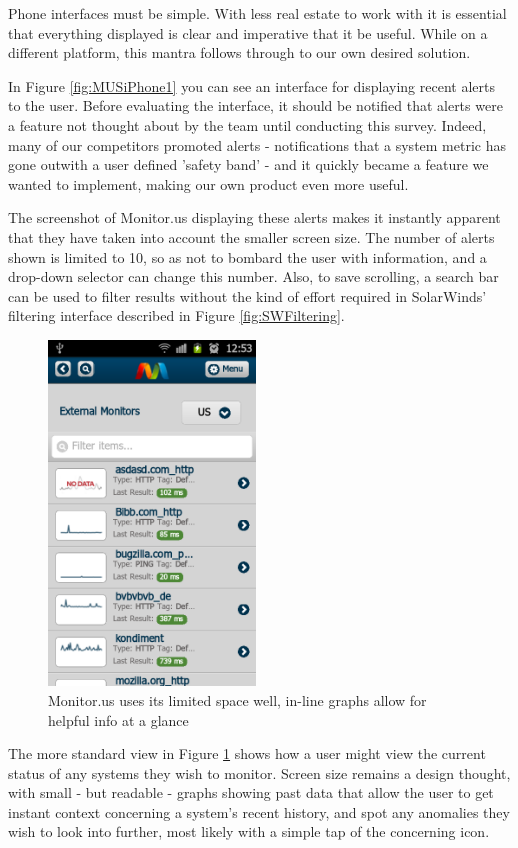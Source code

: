 \documentclass{l3proj}
\begin{document}
Phone interfaces must be simple. With less real estate to work with it is essential that everything displayed is clear and imperative that it be useful. While on a different platform, this mantra follows through to our own desired solution.

In Figure \ref{fig:MUSiPhone1} you can see an interface for displaying recent alerts to the user. Before evaluating the interface, it should be notified that alerts were a feature not thought about by the team until conducting this survey. Indeed, many of our competitors promoted alerts - notifications that a system metric has gone outwith a user defined 'safety band' - and it quickly became a feature we wanted to implement, making our own product even more useful.

The screenshot of Monitor.us displaying these alerts makes it instantly apparent that they have taken into account the smaller screen size. The number of alerts shown is limited to 10, so as not to bombard the user with information, and a drop-down selector can change this number. Also, to save scrolling, a search bar can be used to filter results without the kind of effort required in SolarWinds' filtering interface described in Figure \ref{fig:SWFiltering}.

\begin{figure}[H]
\centering
\includegraphics[width=55mm]{Competitors/MonitorUS_iPhone2.png}
\caption{Monitor.us uses its limited space well, in-line graphs allow for helpful info at a glance}
\label{fig:MUSiPhone2}
\end{figure}

The more standard view in Figure \ref{fig:MUSiPhone2} shows how a user might view the current status of any systems they wish to monitor. Screen size remains a design thought, with small - but readable - graphs showing past data that allow the user to get instant context concerning a system's recent history, and spot any anomalies they wish to look into further, most likely with a simple tap of the concerning icon.
\end{document}
